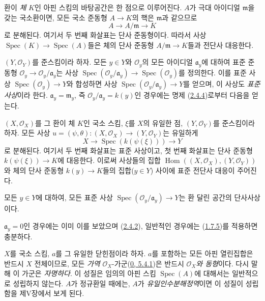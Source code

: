 \begin{env}[2.4.5]
\label{I.2.4.5-ko}
환이 \emph{체} $K$인 아핀 스킴의 바탕공간은 한 점으로 이루어진다. $A$가
극대 아이디얼 $\mathfrak{m}$을 갖는 국소환이면, 모든 국소 준동형
$A\to K$의 핵은 $\mathfrak{m}$과 같으므로
\[
  A\longrightarrow A/\mathfrak{m}\longrightarrow K
\]
로 분해된다. 여기서 두 번째 화살표는 단사 준동형이다. 따라서 사상
$\operatorname{Spec}(K)\to\operatorname{Spec}(A)$들은 체의 단사
준동형 $A/\mathfrak{m}\to K$들과 전단사 대응한다.
\end{env}

$(Y,\mathscr{O}_Y)$를 준스킴이라 하자. 모든 $y\in Y$와
$\mathscr{O}_y$의 모든 아이디얼 $\mathfrak{a}_y$에 대하여 표준 준동형
$\mathscr{O}_y\to\mathscr{O}_y/\mathfrak{a}_y$는 사상
$\operatorname{Spec}(\mathscr{O}_y/\mathfrak{a}_y)
\to\operatorname{Spec}(\mathscr{O}_y)$를 정의한다. 이를 표준 사상
$\operatorname{Spec}(\mathscr{O}_y)\to Y$와 합성하면 사상
$\operatorname{Spec}(\mathscr{O}_y/\mathfrak{a}_y)\to Y$를 얻으며,
이 사상도 \emph{표준 사상}이라 한다. $\mathfrak{a}_y=\mathfrak{m}_y$,
즉 $\mathscr{O}_y/\mathfrak{a}_y=k(y)$인 경우에는 명제
(\hyperref[I.2.4.4-ko]{2.4.4})로부터 다음을 얻는다.

\begin{corollary}[2.4.6]
\label{I.2.4.6-ko}
$(X,\mathscr{O}_X)$를 그 환이 체 $K$인 국소 스킴, $\xi$를 $X$의
유일한 점, $(Y,\mathscr{O}_Y)$를 준스킴이라 하자. 모든 사상
$u=(\psi,\theta):(X,\mathscr{O}_X)\to(Y,\mathscr{O}_Y)$는 유일하게
\[
  X\longrightarrow\operatorname{Spec}(k(\psi(\xi)))
  \longrightarrow Y
\]
로 분해된다. 여기서 두 번째 화살표는 표준 사상이고, 첫 번째 화살표는
단사 준동형 $k(\psi(\xi))\to K$에 대응한다. 이로써 사상들의 집합
$\operatorname{Hom}((X,\mathscr{O}_X),(Y,\mathscr{O}_Y))$와 체의 단사
준동형 $k(y)\to K$들의 집합($y\in Y$) 사이에 표준 전단사 대응이
주어진다.
\end{corollary}

\begin{corollary}[2.4.7]
\label{I.2.4.7-ko}
모든 $y\in Y$에 대하여, 모든 표준 사상
$\operatorname{Spec}(\mathscr{O}_y/\mathfrak{a}_y)\to Y$는 환 달린
공간의 단사사상이다.
\end{corollary}

$\mathfrak{a}_y=0$인 경우에는 이미 이를 보았으며
(\hyperref[I.2.4.2-ko]{2.4.2}), 일반적인 경우에는
(\hyperref[I.1.7.5-ko]{1.7.5})를 적용하면 충분하다.

\begin{remark}[2.4.8]
\label{I.2.4.8-ko}
$X$를 국소 스킴, $a$를 그 유일한 닫힌점이라 하자. $a$를 포함하는
모든 아핀 열린집합은 반드시 $X$ 전체이므로, 모든 \emph{가역}
$\mathscr{O}_X$-가군(\hyperref[0.5.4.1-ko]{0, 5.4.1})은 반드시
\emph{$\mathscr{O}_X$와 동형}이다. 다시
말해 이 가군은 \emph{자명하다}. 이 성질은 임의의 아핀 스킴
$\operatorname{Spec}(A)$에 대해서는 일반적으로 성립하지 않는다.
$A$가 정규환일 때에는, $A$가 \emph{유일인수분해정역}이면 이 성질이
성립함을 제V장에서 보게 된다.
\end{remark}

